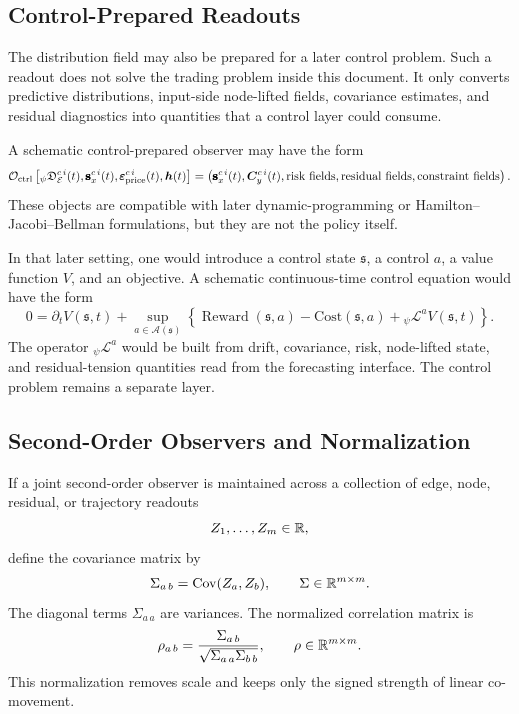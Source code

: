\subsection{Control-Prepared Readouts}
\label{subsec:control-prepared-readouts}

The distribution field may also be prepared for a later control problem.  Such a
readout does not solve the trading problem inside this document.  It only
converts predictive distributions, input-side node-lifted fields, covariance
estimates, and residual diagnostics into quantities that a control layer could
consume.

A schematic control-prepared observer may have the form
\[
  \mathcal{O}_{\mathrm{ctrl}}
  \left[
    {}_{\psi}\mathfrak{D}_{\mathcal{E}}^{c\,i}(t),
    \pmb{\mathbf{s}}_{x}^{c\,i}(t),
    \pmb{\mathbf{\varepsilon}}_{\mathrm{price}}^{c\,i}(t),
    \bm{h}(t)
  \right]
  =
  \left(
    \pmb{\mathbf{s}}_{x}^{c\,i}(t),
    \bm{C}_{y}^{c\,i}(t),
    \text{risk fields},
    \text{residual fields},
    \text{constraint fields}
  \right).
\]
These objects are compatible with later dynamic-programming or
Hamilton--Jacobi--Bellman formulations, but they are not the policy itself.

In that later setting, one would introduce a control state $\mathfrak{s}$, a
control $a$, a value function $V$, and an objective.  A schematic
continuous-time control equation would have the form
\[
  0
  =
  \partial_t V(\mathfrak{s},t)
  +
  \sup_{a\in\mathcal{A}(\mathfrak{s})}
  \left\{
    \operatorname{Reward}(\mathfrak{s},a)
    -
    \mathrm{Cost}(\mathfrak{s},a)
    +
    {}_{\psi}\mathcal{L}^{a}V(\mathfrak{s},t)
  \right\}.
\]
The operator ${}_{\psi}\mathcal{L}^{a}$ would be built from drift, covariance,
risk, node-lifted state, and residual-tension quantities read from the
forecasting interface.  The control problem remains a separate layer.

\subsection{Second-Order Observers and Normalization}
\label{subsec:second-order-observers-and-normalization}

If a joint second-order observer is maintained across a collection of edge,
node, residual, or trajectory readouts
\[
  Z_1,\ldots,Z_m\in\mathbb{R},
\]
define the covariance matrix by
\[
  \Sigma_{a\,b}
  =
  \operatorname{Cov}(Z_a,Z_b),
  \qquad
  \Sigma\in\mathbb{R}^{m\times m}.
\]
The diagonal terms $\Sigma_{a\,a}$ are variances.  The normalized correlation
matrix is
\[
  \rho_{a\,b}
  =
  \frac{
    \Sigma_{a\,b}
  }{
    \sqrt{\Sigma_{a\,a}\Sigma_{b\,b}}
  },
  \qquad
  \rho\in\mathbb{R}^{m\times m}.
\]
This normalization removes scale and keeps only the signed strength of linear
co-movement.

